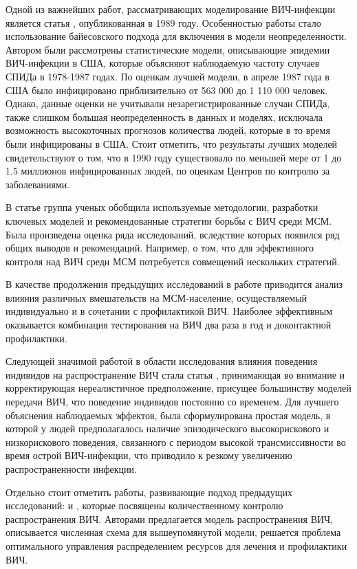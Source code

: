 \documentclass[a4paper]{report}
\begin{document}
	Одной из важнейших работ, рассматривающих моделирование ВИЧ-инфекции является статья \cite{link17}, опубликованная в 1989 году.
	Особенностью работы стало использование байесовского подхода для включения в модели неопределенности.
	Автором были рассмотрены статистические модели, описывающие эпидемии ВИЧ-инфекции в США, которые объясняют наблюдаемую частоту случаев СПИДа в 1978-1987 годах.
	По оценкам лучшей модели, в апреле 1987 года в США было инфицировано приблизительно от 563 000 до 1 110 000 человек. Однако, данные оценки не учитывали незарегистрированные случаи СПИДа, также слишком большая неопределенность в данных и моделях, исключала возможность высокоточных прогнозов количества людей, которые в то время были инфицированы в США. Стоит отметить, что результаты лучших моделей свидетельствуют о том, что в 1990 году существовало по меньшей мере от 1 до 1.5 миллионов инфицированных людей, по оценкам Центров по контролю за заболеваниями.
	
	В статье \cite{link18} группа ученых обобщила используемые методологии, разработки ключевых моделей и рекомендованные стратегии борьбы с ВИЧ среди МСМ. Была произведена оценка ряда исследований, вследствие которых появился ряд общих выводов и рекомендаций. Например, о том, что для эффективного контроля над ВИЧ среди МСМ потребуется совмещений нескольких стратегий.

	В качестве продолжения предыдущих исследований в работе \cite{link19} приводится анализ влияния различных вмешательств на МСМ-население, осуществляемый индивидуально и в сочетании с профилактикой ВИЧ. Наиболее эффективным оказывается комбинация тестирования на ВИЧ два раза в год и доконтактной профилактики.
	
	Следующей значимой работой в области исследования влияния поведения индивидов на распространение ВИЧ стала статья \cite{link20}, принимающая во внимание и корректирующая нереалистичное предположение, присущее большинству моделей передачи ВИЧ, что поведение индивидов постоянно со временем. 
	Для лучшего объяснения наблюдаемых эффектов, была сформулирована простая модель, в которой у людей предполагалось наличие эпизодического высокорискового и низкорискового поведения, связанного с периодом высокой трансмиссивности во время острой ВИЧ-инфекции, что приводило к резкому увеличению распространенности инфекции.
	
	Отдельно стоит отметить работы, развивающие подход предыдущих исследований: \cite{link21} и \cite{link22}, которые посвящены количественному контролю распространения ВИЧ. Авторами предлагается модель распространения ВИЧ, описывается численная схема для вышеупомянутой модели, решается проблема оптимального управления распределением ресурсов для лечения и профилактики ВИЧ.
	
\end{document}
